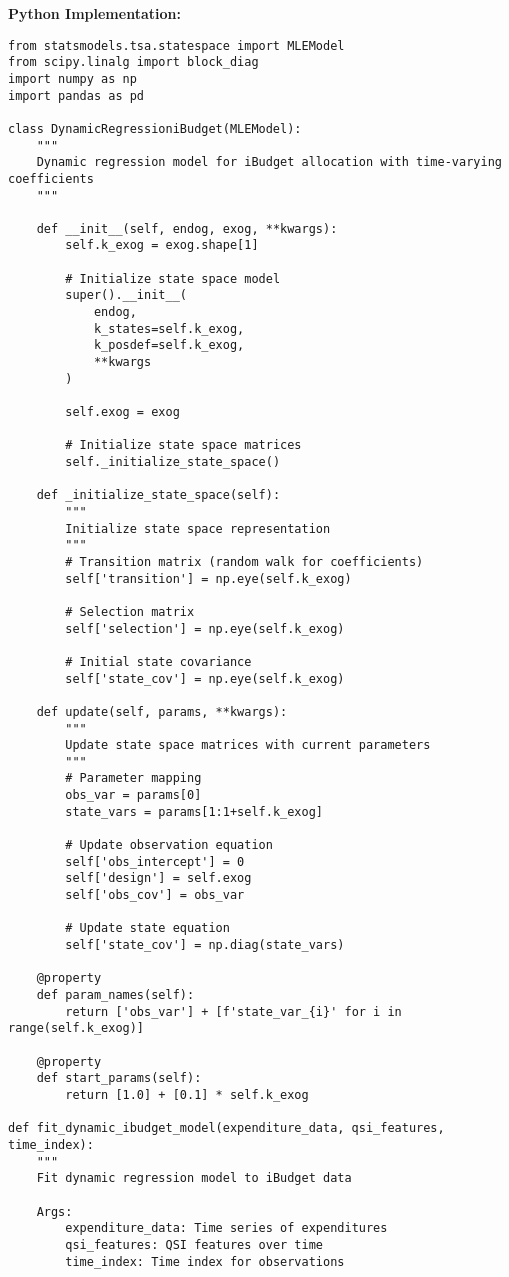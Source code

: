 \textbf{Python Implementation:}
\begin{lstlisting}
from statsmodels.tsa.statespace import MLEModel
from scipy.linalg import block_diag
import numpy as np
import pandas as pd

class DynamicRegressioniBudget(MLEModel):
    """
    Dynamic regression model for iBudget allocation with time-varying coefficients
    """
    
    def __init__(self, endog, exog, **kwargs):
        self.k_exog = exog.shape[1]
        
        # Initialize state space model
        super().__init__(
            endog, 
            k_states=self.k_exog,
            k_posdef=self.k_exog,
            **kwargs
        )
        
        self.exog = exog
        
        # Initialize state space matrices
        self._initialize_state_space()
    
    def _initialize_state_space(self):
        """
        Initialize state space representation
        """
        # Transition matrix (random walk for coefficients)
        self['transition'] = np.eye(self.k_exog)
        
        # Selection matrix
        self['selection'] = np.eye(self.k_exog)
        
        # Initial state covariance
        self['state_cov'] = np.eye(self.k_exog)
        
    def update(self, params, **kwargs):
        """
        Update state space matrices with current parameters
        """
        # Parameter mapping
        obs_var = params[0]
        state_vars = params[1:1+self.k_exog]
        
        # Update observation equation
        self['obs_intercept'] = 0
        self['design'] = self.exog
        self['obs_cov'] = obs_var
        
        # Update state equation
        self['state_cov'] = np.diag(state_vars)
        
    @property
    def param_names(self):
        return ['obs_var'] + [f'state_var_{i}' for i in range(self.k_exog)]
    
    @property
    def start_params(self):
        return [1.0] + [0.1] * self.k_exog

def fit_dynamic_ibudget_model(expenditure_data, qsi_features, time_index):
    """
    Fit dynamic regression model to iBudget data
    
    Args:
        expenditure_data: Time series of expenditures
        qsi_features: QSI features over time
        time_index: Time index for observations
    

\end{lstlisting}
